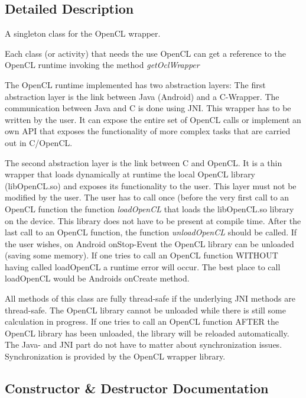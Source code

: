 \subsection{Detailed Description}
A singleton class for the Open\+CL wrapper.

Each class (or activity) that needs the use Open\+CL can get a reference to the Open\+CL runtime invoking the method {\itshape get\+Ocl\+Wrapper}

The Open\+CL runtime implemented has two abstraction layers\+: The first abstraction layer is the link between Java (Android) and a C-\/\+Wrapper. The communication between Java and C is done using J\+NI. This wrapper has to be written by the user. It can expose the entire set of Open\+CL calls or implement an own A\+PI that exposes the functionality of more complex tasks that are carried out in C/\+Open\+CL.

The second abstraction layer is the link between C and Open\+CL. It is a thin wrapper that loads dynamically at runtime the local Open\+CL library (lib\+Open\+C\+L.\+so) and exposes its functionality to the user. This layer must not be modified by the user. The user has to call once (before the very first call to an Open\+CL function the function {\itshape load\+Open\+CL} that loads the lib\+Open\+C\+L.\+so library on the device. This library does not have to be present at compile time. After the last call to an Open\+CL function, the function {\itshape unload\+Open\+CL} should be called. If the user wishes, on Android on\+Stop-\/\+Event the Open\+CL library can be unloaded (saving some memory). If one tries to call an Open\+CL function W\+I\+T\+H\+O\+UT having called \textquotesingle{}load\+Open\+CL\textquotesingle{} a runtime error will occur. The best place to call \textquotesingle{}load\+Open\+CL\textquotesingle{} would be Androids \textquotesingle{}on\+Create\textquotesingle{} method.

All methods of this class are fully thread-\/safe if the underlying J\+NI methods are thread-\/safe. The Open\+CL library cannot be unloaded while there is still some calculation in progress. If one tries to call an Open\+CL function A\+F\+T\+ER the Open\+CL library has been unloaded, the library will be reloaded automatically. The Java-\/ and J\+NI part do not have to matter about synchronization issues. Synchronization is provided by the Open\+CL wrapper library.

\subsection{Constructor \& Destructor Documentation}
\mbox{\label{classcom_1_1example_1_1dmocl_1_1oclwrap_a1fbb83793ed7801f73e2a0ca2cf0f114}} 
